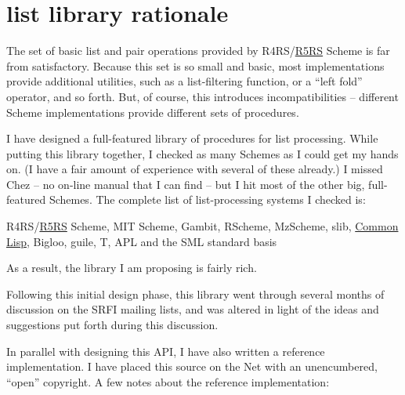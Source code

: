 \section{list library rationale}

The set of basic list and pair operations provided by
R4RS/\protect\hyperlink{R5RS}{R5RS} Scheme is far from satisfactory.
Because this set is so small and basic, most implementations provide
additional utilities, such as a list-filtering function, or a ``left
fold'' operator, and so forth. But, of course, this introduces
incompatibilities -- different Scheme implementations provide different
sets of procedures.

I have designed a full-featured library of procedures for list
processing. While putting this library together, I checked as many
Schemes as I could get my hands on. (I have a fair amount of experience
with several of these already.) I missed Chez -- no on-line manual that
I can find -- but I hit most of the other big, full-featured Schemes.
The complete list of list-processing systems I checked is:

R4RS/\protect\hyperlink{R5RS}{R5RS} Scheme, MIT Scheme, Gambit, RScheme,
MzScheme, slib, \protect\hyperlink{CommonLisp}{Common Lisp}, Bigloo,
guile, T, APL and the SML standard basis

As a result, the library I am proposing is fairly rich.

Following this initial design phase, this library went through several
months of discussion on the SRFI mailing lists, and was altered in light
of the ideas and suggestions put forth during this discussion.

In parallel with designing this API, I have also written a reference
implementation. I have placed this source on the Net with an
unencumbered, ``open'' copyright. A few notes about the reference
implementation:

